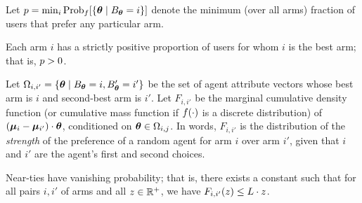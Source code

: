 Let $\MinProb = \min_{i} \Prob[\AgentDist]{\Set{\AgV}{\Best{\AgV} = i}}$
denote the minimum (over all arms) fraction of users that prefer any
particular arm.

\begin{assumption} \label{A3}
Each arm $i$ has a strictly positive proportion of users for whom $i$
is the best arm; that is, $p > 0$.
\end{assumption}

Let $\Omega_{i,i'} = \{ \bm{\theta} \mid B_{\bm{\theta}} = i, B'_{\bm{\theta}} = i' \}$
be the set of agent attribute vectors whose best arm is $i$ and
second-best arm is $i'$.
Let $F_{i,i'}$ be the marginal cumulative density function
(or cumulative mass function if $f(\cdot)$ is a discrete distribution)
of $(\bm{\mu}_{i}-\bm{\mu}_{i'}) \cdot \bm{\theta}$,
conditioned on $\bm{\theta} \in \Omega_{i,j}$.
In words, $F_{i,i'}$ is the distribution of the \emph{strength} of the
preference of a random agent for arm $i$ over arm $i'$, given that
$i$ and $i'$ are the agent's first and second choices.

\begin{assumption} \label{A1}
Near-ties have vanishing probability; 
that is, there exists a constant \TieDensity such that
for all pairs $i,i'$ of arms and all $z \in \mathbb{R}^+$,
we have $F_{i,i'}(z) \leq L \cdot z$.
\end{assumption}






